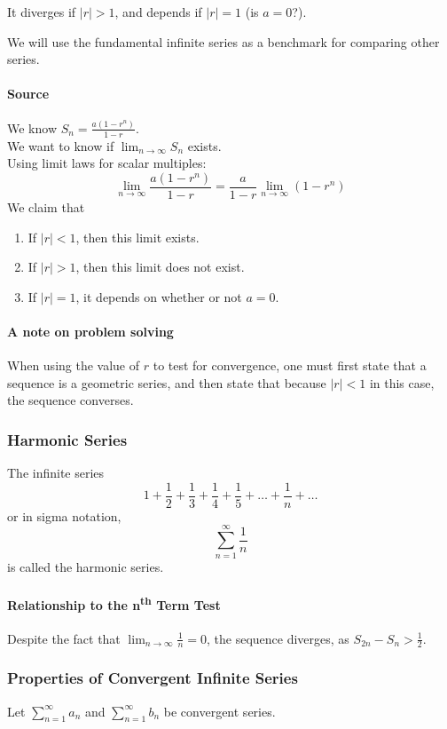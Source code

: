 \documentclass{article}
\begin{document}
It diverges if $|r| > 1$, and depends if $|r| = 1$ (is $a = 0$?).

We will use the fundamental infinite series as a benchmark for comparing other series.

\paragraph{Source}
We know $S_n = \frac{a\left(1-r^n\right)}{1-r}$.\\
We want to know if $\lim_{n \to \infty} S_n$ exists.\\
Using limit laws for scalar multiples:
$$\lim_{n \to \infty} \frac{a\left(1-r^n\right)}{1-r} = \frac{a}{1-r} \lim_{n\to\infty} \left(1 - r^n\right)$$
We claim that
\begin{enumerate}
    \item If $|r| < 1$, then this limit exists.
    \item If $|r| > 1$, then this limit does not exist.
    \item If $|r| = 1$, it depends on whether or not $a = 0$.
\end{enumerate}

\paragraph{A note on problem solving} When using the value of $r$ to test for convergence, one must first state that a sequence is a geometric series, and then state that because $|r| < 1$ in this case, the sequence converses.

\subsubsection{Harmonic Series}
The infinite series
$$1 + \frac{1}{2} + \frac{1}{3} + \frac{1}{4} + \frac{1}{5} + \ldots + \frac{1}{n} + \ldots$$
or in sigma notation,
$$\sum_{n=1}^{\infty} \frac{1}{n}$$
is called the harmonic series.

\paragraph{Relationship to the n\textsuperscript{th} Term Test} Despite the fact that $\lim_{n \to \infty} \frac{1}{n} = 0$, the sequence diverges, as $S_{2n} - S_n > \frac{1}{2}$.

\subsubsection{Properties of Convergent Infinite Series}
Let $\sum_{n=1}^{\infty} a_n$ and $\sum_{n=1}^{\infty} b_n$ be convergent series.
\end{document}
